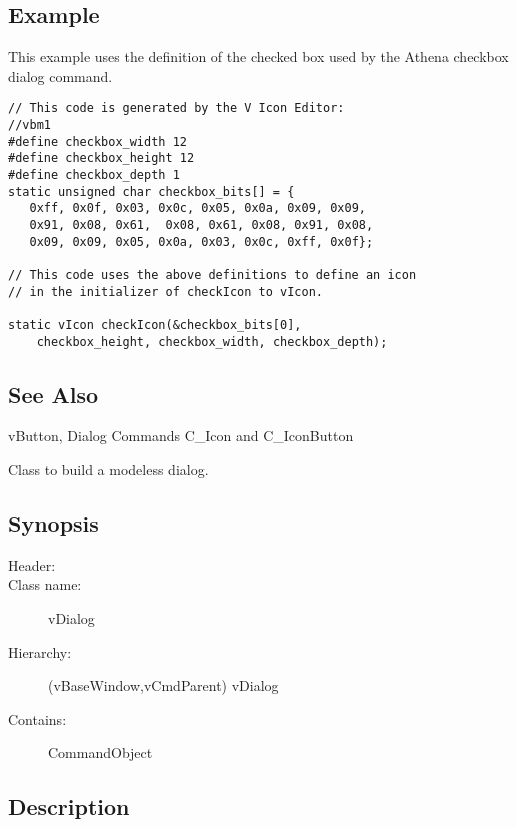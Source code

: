 \subsection* {Example}

This example uses the definition of the checked box used by the
Athena checkbox dialog command.

\footnotesize
\begin{verbatim}
// This code is generated by the V Icon Editor:
//vbm1
#define checkbox_width 12
#define checkbox_height 12
#define checkbox_depth 1
static unsigned char checkbox_bits[] = {
   0xff, 0x0f, 0x03, 0x0c, 0x05, 0x0a, 0x09, 0x09, 
   0x91, 0x08, 0x61,  0x08, 0x61, 0x08, 0x91, 0x08,
   0x09, 0x09, 0x05, 0x0a, 0x03, 0x0c, 0xff, 0x0f};

// This code uses the above definitions to define an icon
// in the initializer of checkIcon to vIcon.

static vIcon checkIcon(&checkbox_bits[0],
    checkbox_height, checkbox_width, checkbox_depth);

\end{verbatim}
\normalfont\normalsize

\subsection* {See Also}

vButton, Dialog Commands C\_Icon and C\_IconButton


Class to build a modeless dialog.

\subsection* {Synopsis}

\begin{description}
	\item [Header:] 
	\item [Class name:] vDialog
 	\item [Hierarchy:] (vBaseWindow,vCmdParent) \rta vDialog
	\item [Contains:] CommandObject
\end{description}

\subsection* {Description}

